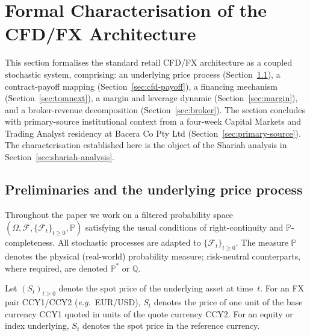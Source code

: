 \documentclass[preprint,12pt,authoryear]{elsarticle}
\newcommand{\PP}{\mathbb{P}}
\newcommand{\FF}{\mathcal{F}}
\newcommand{\eg}{\emph{e.g.}}
\theoremstyle{definition}
\begin{document}
\section{Formal Characterisation of the CFD/FX Architecture}
\label{sec:cfd-mechanics}

This section formalises the standard retail CFD/FX architecture as a
coupled stochastic system, comprising: an underlying price process
(Section~\ref{sec:price-process}), a contract-payoff mapping
(Section~\ref{sec:cfd-payoff}), a financing mechanism
(Section~\ref{sec:tomnext}), a margin and leverage dynamic
(Section~\ref{sec:margin}), and a broker-revenue decomposition
(Section~\ref{sec:broker}). The section concludes with primary-source
institutional context from a four-week Capital Markets and Trading
Analyst residency at Bacera Co Pty Ltd
(Section~\ref{sec:primary-source}). The characterisation established
here is the object of the Shariah analysis in
Section~\ref{sec:shariah-analysis}.

\subsection{Preliminaries and the underlying price process}
\label{sec:price-process}

Throughout the paper we work on a filtered probability space
$(\Omega, \FF, \{\FF_t\}_{t \geq 0}, \PP)$ satisfying the usual
conditions of right-continuity and $\PP$-completeness. All stochastic
processes are adapted to $\{\FF_t\}_{t \geq 0}$. The measure $\PP$
denotes the physical (real-world) probability measure; risk-neutral
counterparts, where required, are denoted $\PP^{*}$ or $\mathbb{Q}$.

Let $(S_t)_{t \geq 0}$ denote the spot price of the underlying asset
at time~$t$. For an FX pair CCY1/CCY2 (\eg\ EUR/USD), $S_t$ denotes the
price of one unit of the base currency CCY1 quoted in units of the quote
currency CCY2. For an equity or index underlying, $S_t$ denotes the
spot price in the reference currency.
\end{document}
